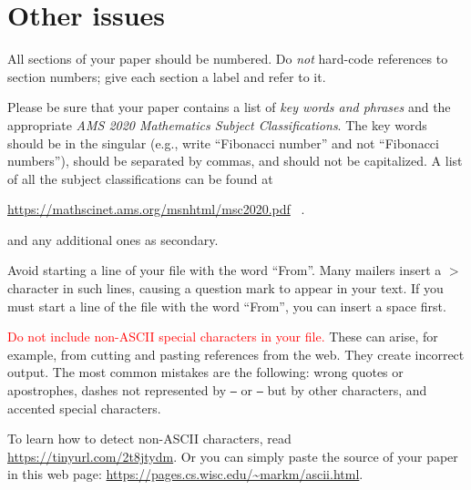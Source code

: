 \documentclass[12pt]{article}
\begin{document}
\section{Other issues}

All sections of your paper should be numbered.  Do {\it not\/}
hard-code references to section numbers; give each section a label
and refer to it.

Please be sure that your paper contains a list of {\it key words and
phrases} and the appropriate {\it AMS 2020 Mathematics Subject
Classifications}.  The key words should be in the singular (e.g., write
``Fibonacci number'' and not ``Fibonacci numbers''), should be separated
by commas, and should not be capitalized.
A list of all the subject
classifications can be found at\newline
\centerline{\url{https://mathscinet.ams.org/msnhtml/msc2020.pdf} \ .}

 and any additional ones as secondary.

Avoid starting a line of your file  with the word ``From''.  Many mailers
insert a $>$ character in such lines, causing a question mark to appear
in your text.  If you must start a line of the file with the
word ``From'', you can insert a space first.

\textcolor{red}{Do not include non-ASCII special characters in your file.}  These can arise,
for example, from cutting and pasting references from the web.  They
create incorrect output.
The most common mistakes are the following:  wrong quotes or apostrophes,
dashes not represented by
{\tt --} or {\tt ---} but by other characters, and accented special
characters.

To learn how to detect non-ASCII characters, read \\
\url{https://tinyurl.com/2t8jtydm}.  Or you can simply paste the source
of your paper in this web page:  \url{https://pages.cs.wisc.edu/~markm/ascii.html}.
\end{document}
